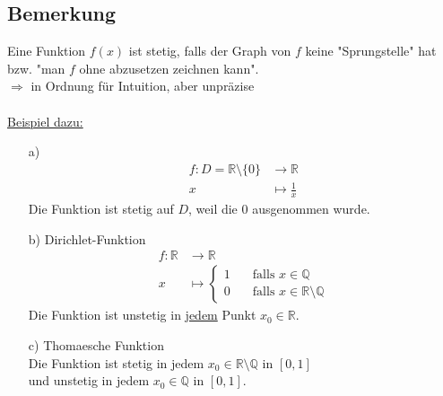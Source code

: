 \documentclass[12pt, titlepage]{article}
\newcommand{\R}{\mathds{R}}
\renewcommand{\*}{\cdot}
\begin{document}
	\subsection{Bemerkung}
	Eine Funktion $f(x)$ ist stetig, falls der Graph von $f$ keine "Sprungstelle" hat bzw. "man $f$ ohne abzusetzen zeichnen kann".\\
	$\Rightarrow$ in Ordnung für Intuition, aber unpräzise\\
	\\
	\underline{Beispiel dazu:}
	\begin{itemize}
		\item[a)]
		\begin{align*}
			f\colon D=\R\setminus\{0\}&\rightarrow\R\\x&\mapsto\frac{1}{x}
		\end{align*}
		Die Funktion ist stetig auf $D$, weil die $0$ ausgenommen wurde.
		\item[b)] Dirichlet-Funktion
		\begin{align*}
			f\colon\R&\rightarrow\R\\
			x&\mapsto\begin{cases}1\quad&\textrm{falls }x\in\mathds{Q}\\
			0\quad&\textrm{falls }x\in\R\setminus\mathds{Q}
			\end{cases}
		\end{align*}
		Die Funktion ist unstetig in \underline{jedem} Punkt $x_0\in\R$.
		\item[c)] Thomaesche Funktion\\
		Die Funktion ist stetig in jedem $x_0\in\R\setminus\mathds{Q}$ in $[0,1]$\\
		und unstetig in jedem $x_0\in\mathds{Q}$ in $[0,1]$.
	\end{itemize}
\end{document}
